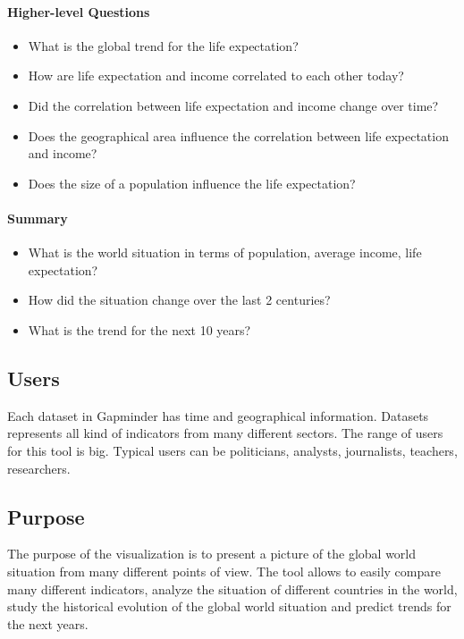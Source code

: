 \paragraph{Higher-level Questions}
\begin{itemize}

    \item What is the global trend for the life expectation?

    \item How are life expectation and income correlated to each other today?    
    \item Did the correlation between life expectation and income change over time?
    \item Does the geographical area influence the correlation between life expectation and income?
    \item Does the size of a population influence the life expectation?
    
\end{itemize}

\paragraph{Summary}
\begin{itemize}
    \item What is the world situation in terms of population, average income, life expectation?
    \item How did the situation change over the last 2 centuries?
    \item What is the trend for the next 10 years?
\end{itemize}

\subsection{Users}
Each dataset in Gapminder has time and geographical information.
Datasets represents all kind of indicators from many different sectors.
The range of users for this tool is big.
Typical users can be politicians, analysts, journalists, teachers, researchers.

\subsection{Purpose}
The purpose of the visualization is to present a picture of the global world situation from many different points of view.
The tool allows to easily compare many different indicators, analyze the situation of different countries in the world, study the historical evolution of the global world situation and predict trends for the next years.
